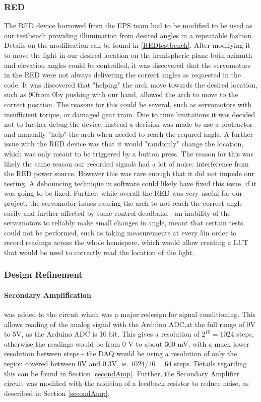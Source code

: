 \subsubsection{\acf{RED}}  %
The \ac{RED} device borrowed from the EPS team \cite{RefWorks:shopov2022renewable} had to be modified to be used as our testbench providing illumination from desired angles in a repeatable fashion. Details on the modification can be found in \ref{REDtestbench}. After modifying it to move the light in our desired location on the hemispheric plane both azimuth and elevation angles could be controlled, it was discovered that the servomotors in the \ac{RED} were not always delivering the correct angles as requested in the code. It was discovered that "helping" the arch move towards the desired location, such as 90\textdegree from 0\textdegree by pushing with our hand, allowed the arch to move to the correct position. The reasons for this could be several, such as servomotors with insufficient torque, or damaged gear train. Due to time limitations it was decided not to further debug the device, instead a decision was made to use a protractor and manually "help" the arch when needed to reach the requred angle.
A further issue with the \ac{RED} device was that it would "randomly" change the location, which was only meant to be triggered by a button press. The reason for this was likely the same reason our recorded signals had a lot of noise: interference from the \ac{RED} power source. However this was rare enough that it did not impede our testing. A  debouncing technique in software could likely have fixed this issue, if it was going to be fixed.
Further, while overall the \ac{RED} was very useful for our project, the servomotor issues causing the arch to not reach the correct angle easily and further affected by some control deadband - an inability of the servomotors to reliably make small changes in angle, meant that certain tests could not be performed, such as taking measurements at every 5\textdegree in order to record readings across the whole hemispere, which would allow creating a \ac{LUT} that would be used to correctly read the location of the light.

\subsubsection*{Design Refinement}
\label{explainPostAmp}
\paragraph{Secondary Amplification} was added to the circuit which was a major redesign for signal conditioning. This allows reading of the analog signal with the Arduino \ac{ADC},at the full range of 0V to 5V, as the Arduino \ac{ADC} is 10 bit. This gives a resolution of  $2^{10}=1024$ steps, otherwise the readings would be from 0 V to about 300 mV, with a much lower resolution between steps - the DAQ would be using a resolution of only the region covered between 0V and 0.3V, ie. $1024/16=64$ steps. Details regarding this can be found in Section \ref{secondAmp}. Further, the Secondary Amplifier circuit was modified with the addition of a feedback resistor to reduce noise, as described in Section \ref{secondAmp}.
